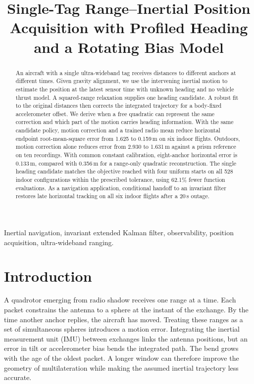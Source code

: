 \documentclass{IEEEtaes}
\begin{document}
\title{Single-Tag Range--Inertial Position Acquisition with Profiled Heading and a Rotating Bias Model}
\author{}
\pagestyle{manuscript}
\let\manuscriptfootnotetext\footnotetext
\renewcommand{\footnotetext}[1]{}
\maketitle
\let\footnotetext\manuscriptfootnotetext
\thispagestyle{manuscript}

\begin{abstract}
An aircraft with a single ultra-wideband tag receives distances to different anchors at different times. Given gravity alignment, we use the intervening inertial motion to estimate the position at the latest sensor time with unknown heading and no vehicle thrust model. A squared-range relaxation supplies one heading candidate. A robust fit to the original distances then corrects the integrated trajectory for a body-fixed accelerometer offset. We derive when a free quadratic can represent the same correction and which part of the motion carries heading information. With the same candidate policy, motion correction and a trained radio mean reduce horizontal endpoint root-mean-square error from 1.625 to 0.159\,m on six indoor flights. Outdoors, motion correction alone reduces error from 2.930 to 1.631\,m against a prism reference on ten recordings. With common constant calibration, eight-anchor horizontal error is 0.133\,m, compared with 0.356\,m for a range-only quadratic reconstruction. The single heading candidate matches the objective reached with four uniform starts on all 528 indoor configurations within the prescribed tolerance, using 62.1\% fewer function evaluations. As a navigation application, conditional handoff to an invariant filter restores late horizontal tracking on all six indoor flights after a 20\,s outage.
\end{abstract}
\begin{IEEEkeywords}
Inertial navigation, invariant extended Kalman filter, observability, position acquisition, ultra-wideband ranging.
\end{IEEEkeywords}

\section{Introduction}\label{sec:intro}
A quadrotor emerging from radio shadow receives one range at a time. Each packet constrains the antenna to a sphere at the instant of the exchange. By the time another anchor replies, the aircraft has moved. Treating these ranges as a set of simultaneous spheres introduces a motion error. Integrating the inertial measurement unit (IMU) between exchanges links the antenna positions, but an error in tilt or accelerometer bias bends the integrated path. The bend grows with the age of the oldest packet. A longer window can therefore improve the geometry of multilateration while making the assumed inertial trajectory less accurate.
\end{document}
